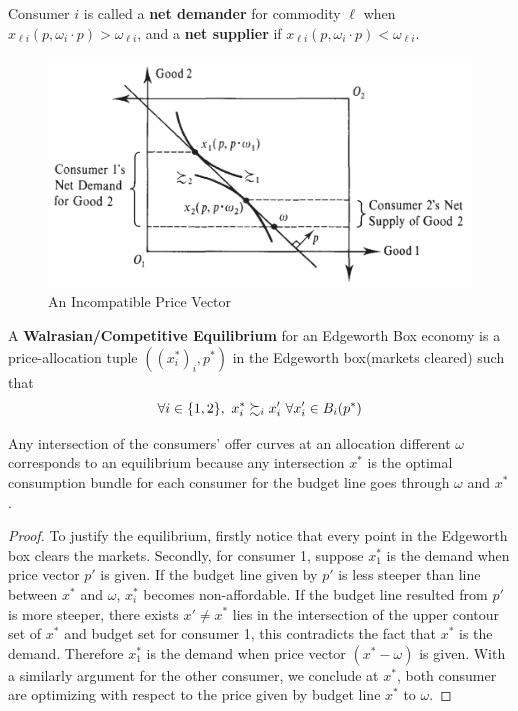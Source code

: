 \documentclass{report}
\begin{document}
		\begin{definition}
			Consumer $i$ is called a \textbf{net demander} for commodity $\ell$ when $x_{\ell i}(p, \omega_i \cdot p) > \omega_{\ell i}$, and a \textbf{net supplier} if $x_{\ell i}(p, \omega_i \cdot p) < \omega_{\ell i}$.
		\end{definition}
		
		\begin{figure}[h]
			\centering
			\includegraphics[width=0.5\linewidth]{figures/net_supplier}
			\caption{An Incompatible Price Vector}
		\end{figure}
		
		\begin{definition}[15.B.1]
			A \textbf{Walrasian/Competitive Equilibrium} for an Edgeworth Box economy is a price-allocation tuple $((x^*_i)_i, p^*)$ in the Edgeworth box(markets cleared) such that
			\begin{equation}
				\forall i \in \{1,2\},\ x_i^* \pref_i x_i'\ \forall x_i' \in B_i(p^*)
			\end{equation}
		\end{definition}
		
		\begin{proposition}
			Any intersection of the consumers' offer curves at an allocation different $\omega$ corresponds to an equilibrium because any intersection $x^*$ is the optimal consumption bundle for each consumer for the budget line goes through $\omega$ and $x^*$.
		\end{proposition}
		
		\begin{proof}
			To justify the equilibrium, firstly notice that every point in the Edgeworth box clears the markets. Secondly, for consumer 1, suppose $x^*_1$ is the demand when price vector $p'$ is given. If the budget line given by $p'$ is less steeper than line between $x^*$ and $\omega$, $x^*_i$ becomes non-affordable. If the budget line resulted from $p'$ is more steeper, there exists $x' \neq x^*$ lies in the intersection of the upper contour set of $x^*$ and budget set for consumer 1, this contradicts the fact that $x^*$ is the demand. Therefore $x^*_1$ is the demand when price vector $(x^* - \omega)$ is given.
			With a similarly argument for the other consumer, we conclude at $x^*$, both consumer are optimizing with respect to the price given by budget line $x^*$ to $\omega$.
		\end{proof}
		
\end{document}
